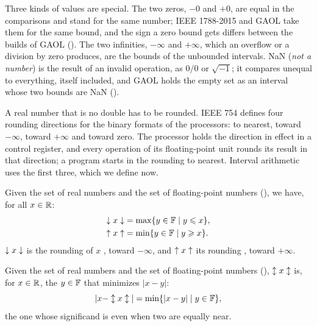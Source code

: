 \documentclass[12pt,a4paper,twoside,openright]{book}
\begin{document}
\medskip
Three kinds of values are special. The two zeros, $-0$ and $+0$, are equal in the
comparisons and stand for the same number; IEEE 1788-2015 and GAOL take them
for the same bound, and the sign a zero bound gets differs between the
builds of GAOL (). The two infinities, $-\infty$ and
$+\infty$, which an overflow or a division by zero produces, are the bounds
of the unbounded intervals. NaN (\emph{not a number}) is the result of an
invalid operation, as $0/0$ or $\sqrt{-1}$; it compares unequal to
everything, itself included, and GAOL holds the empty set as an interval
whose two bounds are NaN ().
%

\medskip
A real number that is no double has to be rounded. IEEE 754 defines four
rounding directions for the binary formats of the processors: to nearest, toward $-\infty$, toward $+\infty$ and
toward zero. The processor holds the direction in effect in a control
register, and every operation of its floating-point unit rounds its result
in that direction; a program starts in the rounding to nearest. Interval
arithmetic uses the first three, which we define now.
%

\begin{Def}\label{def:round-down-up}
%
%
%
%
%
Given \RSet{} the set of real numbers and \FSet{} the set of floating-point
numbers (), we have, for all $x\in\mathbb{R}$:
\begin{align*}
  \downarrow x\downarrow &= \max\{y\in\mathbb{F}\mid y\leqslant x\},\\
  \uparrow x\uparrow &= \min\{y\in\mathbb{F}\mid y\geqslant x\}.
\end{align*}
$\downarrow x\downarrow$ is the rounding of $x$ , toward $-\infty$, and
$\uparrow x\uparrow$ its rounding , toward $+\infty$.
\end{Def}

\begin{Def}\label{def:round-nearest}
%
Given \RSet{} the set of real numbers and \FSet{} the set of floating-point
numbers (), $\updownarrow x\updownarrow$ is, for $x\in\mathbb{R}$, the
$y\in\mathbb{F}$ that minimizes $|x-y|$:
\begin{equation*}
  |x-\updownarrow x\updownarrow| = \min\{|x-y|\mid y\in\mathbb{F}\},
\end{equation*}
the one whose significand is even when two are equally near.
\end{Def}
\end{document}
